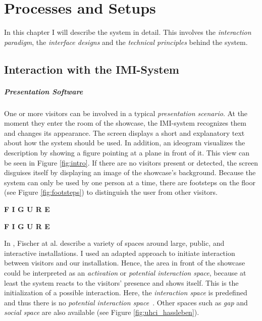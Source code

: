 \chapter{Processes and Setups}
\label{installation}

In this chapter I will describe the system in detail. This involves the \textit{interaction paradigm}, the \textit{interface designs} and the \textit{technical principles} behind the system. 


\section{Interaction with the \ac{IMI}-System}
\label{installation_interaction}

\paragraph{Presentation Software} One or more visitors can be involved in a typical \textit{presentation scenario}. At the moment they enter the room of the showcase, the \ac{IMI}-system recognizes them and changes its appearance. The screen displays a short and explanatory text about how the system should be used. In addition, an ideogram visualizes the description by showing a figure pointing at a plane in front of it. This view can be seen in Figure \ref{fig:intro}. If there are no visitors present or detected, the screen disguises itself by displaying an image of the showcase's background. Because the system can only be used by one person at a time, there are footsteps on the floor (see Figure \ref{fig:footsteps}) to distinguish the user from other visitors. 

\textbf{F I G U R E}

\textbf{F I G U R E}

In \cite{UrbanHCI}, Fischer at al. describe a variety of spaces around large, public, and interactive installations. I used an adapted approach to initiate interaction between visitors and our installation. Hence, the area in front of the showcase could be interpreted as an \textit{activation} or \textit{potential interaction space}, because at least the system reacts to the visitors' presence and shows itself. This is the initialization of a possible interaction. Here, the \textit{interaction space} is predefined and thus there is no \textit{potential interaction space}~\cite{UrbanHCI}. Other spaces such as \textit{gap} and \textit{social space} are also available (see Figure \ref{fig:uhci_hassleben}). 

